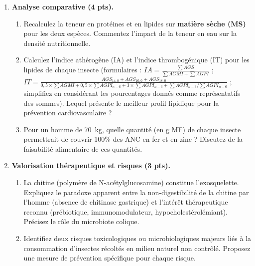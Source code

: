 \documentclass[11pt]{article}
\begin{document}
\begin{exercice}
\begin{enumerate}
\item \textbf{Analyse comparative (4 pts).} 
      \begin{enumerate}
      \item Recalculez la teneur en protéines et en lipides sur \textbf{matière sèche (MS)} pour les deux espèces. Commentez l'impact de la teneur en eau sur la densité nutritionnelle.
      \item Calculez l'indice athérogène (IA) et l'indice thrombogénique (IT) pour les lipides de chaque insecte (formulaires : $IA = \frac{\sum AGS}{\sum AGMI + \sum AGPI}$ ; $IT = \frac{AGS_{14:0}+AGS_{16:0}+AGS_{18:0}}{0,5\times\sum AGMI + 0,5\times\sum AGPI_{n-6} + 3\times\sum AGPI_{n-3} + \sum AGPI_{n-3}/\sum AGPI_{n-6}}$ ; simplifiez en considérant les pourcentages donnés comme représentatifs des sommes). Lequel présente le meilleur profil lipidique pour la prévention cardiovasculaire ?
      \item Pour un homme de \SI{70}{\kilo\gram}, quelle quantité (en g MF) de chaque insecte permettrait de couvrir 100\% des ANC en fer et en zinc ? Discutez de la faisabilité alimentaire de ces quantités.
      \end{enumerate}
\item \textbf{Valorisation thérapeutique et risques (3 pts).} 
      \begin{enumerate}
      \item La chitine (polymère de N-acétylglucosamine) constitue l'exosquelette. Expliquez le paradoxe apparent entre la non-digestibilité de la chitine par l'homme (absence de chitinase gastrique) et l'intérêt thérapeutique reconnu (prébiotique, immunomodulateur, hypocholestérolémiant). Précisez le rôle du microbiote colique.
      \item Identifiez deux risques toxicologiques ou microbiologiques majeurs liés à la consommation d'insectes récoltés en milieu naturel non contrôlé. Proposez une mesure de prévention spécifique pour chaque risque.
      \end{enumerate}
\end{enumerate}
\end{exercice}
\end{document}
